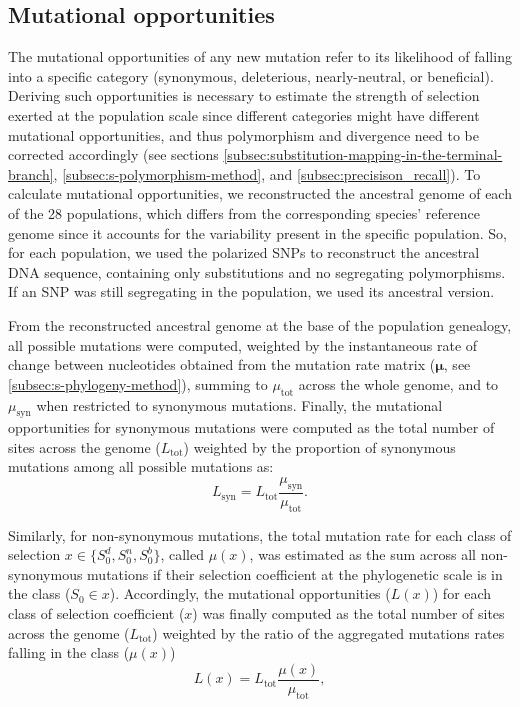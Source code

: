 \documentclass{article}
\newcommand{\UniDimArray}[1]{\bm{#1}}
\newcommand{\Sphy}{S_{0}}
\newcommand{\SphyDel}{\Sphy^{d}}
\newcommand{\SphyNeu}{\Sphy^{n}}
\newcommand{\SphyBen}{\Sphy^{b}}
\newcommand{\Sphyclass}{x}
\begin{document}
    \subsection{Mutational opportunities}
    \label{subsec:nunber-of-sites}
    The mutational opportunities of any new mutation refer to its likelihood of falling into a specific category (synonymous, deleterious, nearly-neutral, or beneficial).
    Deriving such opportunities is necessary to estimate the strength of selection exerted at the population scale since different categories might have different mutational opportunities, and thus polymorphism and divergence need to be corrected accordingly (see sections \ref{subsec:substitution-mapping-in-the-terminal-branch}, \ref{subsec:s-polymorphism-method}, and \ref{subsec:precisison_recall}).
    To calculate mutational opportunities, we reconstructed the ancestral genome of each of the 28 populations, which differs from the corresponding species' reference genome since it accounts for the variability present in the specific population.
    So, for each population, we used the polarized SNPs to reconstruct the ancestral DNA sequence, containing only substitutions and no segregating polymorphisms.
    If an SNP was still segregating in the population, we used its ancestral version.

    From the reconstructed ancestral genome at the base of the population genealogy, all possible mutations were computed, weighted by the instantaneous rate of change between nucleotides obtained from the mutation rate matrix ($\UniDimArray{\mu}$, see \ref{subsec:s-phylogeny-method}), summing to $\mu_{\text{tot}}$ across the whole genome, and to $\mu_{\text{syn}}$ when restricted to synonymous mutations.
    Finally, the mutational opportunities for synonymous mutations were computed as the total number of sites across the genome ($L_{\text{tot}}$) weighted by the proportion of synonymous mutations among all possible mutations as:
    \begin{equation}
        L_{\text{syn}} = L_{\text{tot}} \frac{\mu_{\text{syn}}}{\mu_{\text{tot}}}.
    \end{equation}

    Similarly, for non-synonymous mutations, the total mutation rate for each class of selection $\Sphyclass \in \{\SphyDel, \SphyNeu, \SphyBen \}$, called $\mu\left( \Sphyclass \right)$, was estimated as the sum across all non-synonymous mutations if their selection coefficient at the phylogenetic scale is in the class ($\Sphy \in \Sphyclass$).
    Accordingly, the mutational opportunities ($L \left( \Sphyclass \right)$) for each class of selection coefficient ($\Sphyclass$) was finally computed as the total number of sites across the genome ($L_{\text{tot}}$) weighted by the ratio of the aggregated mutations rates falling in the class ($\mu\left( \Sphyclass \right)$)
    \begin{equation}
        L \left( \Sphyclass \right) = L_{\text{tot}} \frac{\mu\left( \Sphyclass \right)}{\mu_{\text{tot}}},
    \end{equation}
\end{document}
